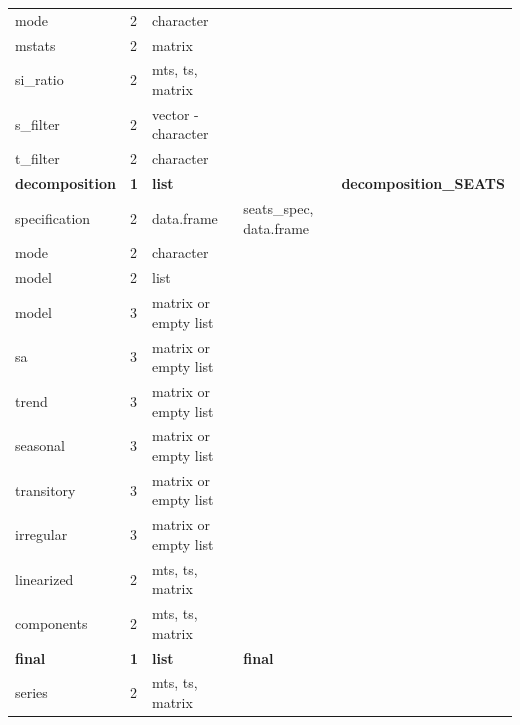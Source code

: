 \documentclass[article]{jss}
\begin{document}
\begin{longtable}[t]{lllll}
\hspace{2em}mode & 2 & character &  \vphantom{1} & \\
\addlinespace
\hspace{2em}mstats & 2 & matrix &  & \\
\hspace{2em}si\_ratio & 2 & mts, ts, matrix &  & \\
\hspace{2em}s\_filter & 2 & vector - character &  & \\
\hspace{2em}t\_filter & 2 & character &  & \\
\textbf{\hspace{1em}decomposition} & \textbf{1} & \textbf{list} & \textbf{} & \textbf{decomposition\_SEATS}\\
\addlinespace
\hspace{2em}specification & 2 & data.frame & seats\_spec, data.frame & \\
\hspace{2em}mode & 2 & character &  & \\
\hspace{2em}model & 2 & list &  & \\
\hspace{3em}model & 3 & matrix or empty list &  & \\
\hspace{3em}sa & 3 & matrix or empty list &  & \\
\addlinespace
\hspace{3em}trend & 3 & matrix or empty list &  & \\
\hspace{3em}seasonal & 3 & matrix or empty list &  & \\
\hspace{3em}transitory & 3 & matrix or empty list &  & \\
\hspace{3em}irregular & 3 & matrix or empty list &  & \\
\hspace{2em}linearized & 2 & mts, ts, matrix &  & \\
\addlinespace
\hspace{2em}components & 2 & mts, ts, matrix &  & \\
\textbf{\hspace{1em}final} & \textbf{1} & \textbf{list} & \textbf{final}\\
\hspace{2em}series & 2 & mts, ts, matrix &  & \\

\end{longtable}
\end{document}
